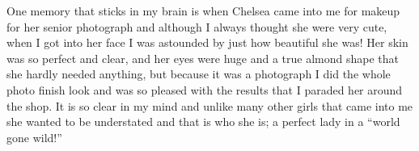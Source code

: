 One memory that sticks in my brain is when Chelsea came into me for makeup for
her senior photograph and although I always thought she were very cute, when
I got into her face I was astounded by just how beautiful she was!  Her skin
was so perfect and clear, and her eyes were huge and a true almond shape that
she hardly needed anything,  but because it was a photograph I did the whole
photo finish look and was so pleased with the results that I paraded her around
the shop. It is so clear in my mind and unlike many other girls that came into
me she wanted to be understated and that is who she is; a perfect lady in
a ``world gone wild!''
\begin{window}
\smallskip
\end{window}
